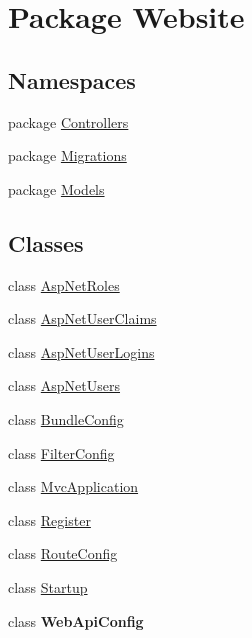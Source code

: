 \hypertarget{namespace_website}{}\section{Package Website}
\label{namespace_website}
\subsection*{Namespaces}
\begin{DoxyCompactItemize}
\item 
package \hyperlink{namespace_website_1_1_controllers}{Controllers}
\item 
package \hyperlink{namespace_website_1_1_migrations}{Migrations}
\item 
package \hyperlink{namespace_website_1_1_models}{Models}
\end{DoxyCompactItemize}
\subsection*{Classes}
\begin{DoxyCompactItemize}
\item 
class \hyperlink{class_website_1_1_asp_net_roles}{Asp\+Net\+Roles}
\item 
class \hyperlink{class_website_1_1_asp_net_user_claims}{Asp\+Net\+User\+Claims}
\item 
class \hyperlink{class_website_1_1_asp_net_user_logins}{Asp\+Net\+User\+Logins}
\item 
class \hyperlink{class_website_1_1_asp_net_users}{Asp\+Net\+Users}
\item 
class \hyperlink{class_website_1_1_bundle_config}{Bundle\+Config}
\item 
class \hyperlink{class_website_1_1_filter_config}{Filter\+Config}
\item 
class \hyperlink{class_website_1_1_mvc_application}{Mvc\+Application}
\item 
class \hyperlink{class_website_1_1_register}{Register}
\item 
class \hyperlink{class_website_1_1_route_config}{Route\+Config}
\item 
class \hyperlink{class_website_1_1_startup}{Startup}
\item 
class {\bfseries Web\+Api\+Config}
\end{DoxyCompactItemize}
